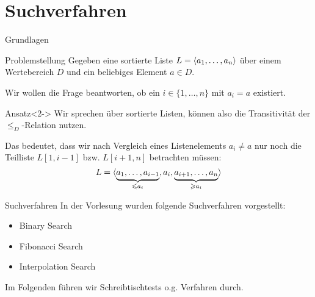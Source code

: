 \section{Suchverfahren}

\begin{frame}{Grundlagen}
\begin{block}{Problemstellung}
Gegeben eine \alert{sortierte} Liste $L = \langle a_1, \dots, a_n\rangle$ \"uber einem Wertebereich $D$ und ein beliebiges Element $a \in D$.

Wir wollen die Frage beantworten, ob ein $i \in \{ 1, \dots, n \}$ mit $a_i = a$ existiert.
\end{block}
\begin{block}{Ansatz}<2->
Wir sprechen \"uber \alert{sortierte} Listen, k\"onnen also die \alert{Transitivit\"at} der $\leq_D$-Relation nutzen.

Das bedeutet, dass wir nach Vergleich eines Listenelements $a_i \neq a$ nur noch die Teilliste $L[1, i-1]$ bzw. $L[i+1, n]$ betrachten m\"ussen:
$$L = \langle\underbrace{a_1, \dots, a_{i-1}}_{\leqslant a_i}, a_i, \underbrace{a_{i+1}, \dots, a_n}_{\geqslant a_i}\rangle$$
\end{block}
\end{frame}

\begin{frame}{Suchverfahren}
In der Vorlesung wurden folgende Suchverfahren vorgestellt:
\begin{itemize}
    \item Binary Search
    \item Fibonacci Search
    \item Interpolation Search
\end{itemize}
Im Folgenden führen wir Schreibtischtests o.g. Verfahren durch.
\end{frame}